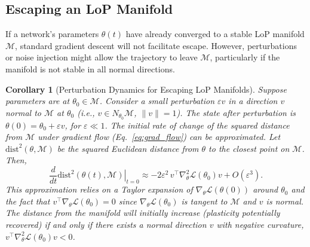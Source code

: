 \documentclass{article}
\newcommand{\Loss}{\mathcal{L}}
\newtheorem{corollary}{Corollary}[section]
\begin{document}
\subsection{Escaping an LoP Manifold}
If a network's parameters $\theta(t)$ have already converged to a stable LoP manifold $\mathcal{M}$, standard gradient descent will not facilitate escape. However, perturbations or noise injection might allow the trajectory to leave $\mathcal{M}$, particularly if the manifold is not stable in all normal directions.

\begin{corollary}[Perturbation Dynamics for Escaping LoP Manifolds]
\label{cor:perturb}
Suppose parameters are at $\theta_0 \in \mathcal{M}$. Consider a small perturbation $\varepsilon v$ in a direction $v$ normal to $\mathcal{M}$ at $\theta_0$ (i.e., $v \in N_{\theta_0}\mathcal{M}$, $\|v\|=1$). The state after perturbation is $\theta(0)=\theta_0+\varepsilon v$, for $\varepsilon \ll 1$.
The initial rate of change of the squared distance from $\mathcal{M}$ under gradient flow (Eq.~\ref{eq:grad_flow}) can be approximated. Let $\mathrm{dist}^2(\theta, \mathcal{M})$ be the squared Euclidean distance from $\theta$ to the closest point on $\mathcal{M}$. Then,
\[
\frac{d}{dt}\left.\mathrm{dist}^2(\theta(t),\mathcal{M})\right|_{t=0} \approx -2\varepsilon^2\,v^\top\nabla_\theta^2\Loss(\theta_0)v + O(\varepsilon^3).
\]
This approximation relies on a Taylor expansion of $\nabla_\theta \Loss(\theta(0))$ around $\theta_0$ and the fact that $v^\top \nabla_\theta \Loss(\theta_0) = 0$ since $\nabla_\theta \Loss(\theta_0)$ is tangent to $\mathcal{M}$ and $v$ is normal.
The distance from the manifold will initially increase (plasticity potentially recovered) if and only if there exists a normal direction $v$ with negative curvature, $v^\top\nabla_\theta^2\Loss(\theta_0)v < 0$.
\end{corollary}
\end{document}
